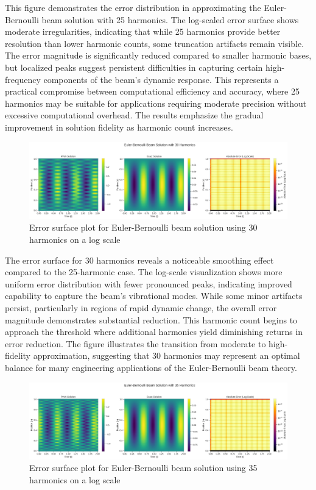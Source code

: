 \documentclass[preprint,12pt]{elsarticle}
\begin{document}
This figure demonstrates the error distribution in approximating the Euler-Bernoulli beam solution with 25 harmonics. The log-scaled error surface shows moderate irregularities, indicating that while 25 harmonics provide better resolution than lower harmonic counts, some truncation artifacts remain visible. The error magnitude is significantly reduced compared to smaller harmonic bases, but localized peaks suggest persistent difficulties in capturing certain high-frequency components of the beam's dynamic response. This represents a practical compromise between computational efficiency and accuracy, where 25 harmonics may be suitable for applications requiring moderate precision without excessive computational overhead. The results emphasize the gradual improvement in solution fidelity as harmonic count increases.

\begin{figure}[t]
    \centering
    \includegraphics[width=0.9\linewidth]{figures/comparison_30h.png}
    \caption{Error surface plot for Euler-Bernoulli beam solution using 30 harmonics on a log scale}
    \label{fig:error_30h}
\end{figure}

The error surface for 30 harmonics reveals a noticeable smoothing effect compared to the 25-harmonic case. The log-scale visualization shows more uniform error distribution with fewer pronounced peaks, indicating improved capability to capture the beam's vibrational modes. While some minor artifacts persist, particularly in regions of rapid dynamic change, the overall error magnitude demonstrates substantial reduction. This harmonic count begins to approach the threshold where additional harmonics yield diminishing returns in error reduction. The figure illustrates the transition from moderate to high-fidelity approximation, suggesting that 30 harmonics may represent an optimal balance for many engineering applications of the Euler-Bernoulli beam theory.

\begin{figure}[t]
    \centering
    \includegraphics[width=0.9\linewidth]{figures/comparison_35h.png}
    \caption{Error surface plot for Euler-Bernoulli beam solution using 35 harmonics on a log scale}
    \label{fig:error_35h}
\end{figure}
\end{document}
